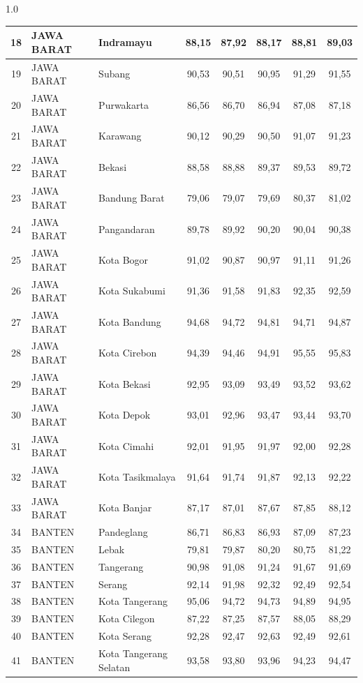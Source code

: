 \begin{spacing}{1.0}
\begin{longtable}{|c|p{2.2cm}|p{2.8cm}|c|c|c|c|c|}
18 & JAWA BARAT & Indramayu & 88,15 & 87,92 & 88,17 & 88,81 & 89,03 \\ \hline
19 & JAWA BARAT & Subang & 90,53 & 90,51 & 90,95 & 91,29 & 91,55 \\ \hline
20 & JAWA BARAT & Purwakarta & 86,56 & 86,70 & 86,94 & 87,08 & 87,18 \\ \hline
21 & JAWA BARAT & Karawang & 90,12 & 90,29 & 90,50 & 91,07 & 91,23 \\ \hline
22 & JAWA BARAT & Bekasi & 88,58 & 88,88 & 89,37 & 89,53 & 89,72 \\ \hline
23 & JAWA BARAT & Bandung Barat & 79,06 & 79,07 & 79,69 & 80,37 & 81,02 \\ \hline
24 & JAWA BARAT & Pangandaran & 89,78 & 89,92 & 90,20 & 90,04 & 90,38 \\ \hline
25 & JAWA BARAT & Kota Bogor & 91,02 & 90,87 & 90,97 & 91,11 & 91,26 \\ \hline
26 & JAWA BARAT & Kota Sukabumi & 91,36 & 91,58 & 91,83 & 92,35 & 92,59 \\ \hline
27 & JAWA BARAT & Kota Bandung & 94,68 & 94,72 & 94,81 & 94,71 & 94,87 \\ \hline
28 & JAWA BARAT & Kota Cirebon & 94,39 & 94,46 & 94,91 & 95,55 & 95,83 \\ \hline
29 & JAWA BARAT & Kota Bekasi & 92,95 & 93,09 & 93,49 & 93,52 & 93,62 \\ \hline
30 & JAWA BARAT & Kota Depok & 93,01 & 92,96 & 93,47 & 93,44 & 93,70 \\ \hline
31 & JAWA BARAT & Kota Cimahi & 92,01 & 91,95 & 91,97 & 92,00 & 92,28 \\ \hline
32 & JAWA BARAT & Kota Tasikmalaya & 91,64 & 91,74 & 91,87 & 92,13 & 92,22 \\ \hline
33 & JAWA BARAT & Kota Banjar & 87,17 & 87,01 & 87,67 & 87,85 & 88,12 \\ \hline
34 & BANTEN & Pandeglang & 86,71 & 86,83 & 86,93 & 87,09 & 87,23 \\ \hline
35 & BANTEN & Lebak & 79,81 & 79,87 & 80,20 & 80,75 & 81,22 \\ \hline
36 & BANTEN & Tangerang & 90,98 & 91,08 & 91,24 & 91,67 & 91,69 \\ \hline
37 & BANTEN & Serang & 92,14 & 91,98 & 92,32 & 92,49 & 92,54 \\ \hline
38 & BANTEN & Kota Tangerang & 95,06 & 94,72 & 94,73 & 94,89 & 94,95 \\ \hline
39 & BANTEN & Kota Cilegon & 87,22 & 87,25 & 87,57 & 88,05 & 88,29 \\ \hline
40 & BANTEN & Kota Serang & 92,28 & 92,47 & 92,63 & 92,49 & 92,61 \\ \hline
41 & BANTEN & Kota Tangerang Selatan & 93,58 & 93,80 & 93,96 & 94,23 & 94,47 \\ \hline
\end{longtable}
\end{spacing}
\newpage
